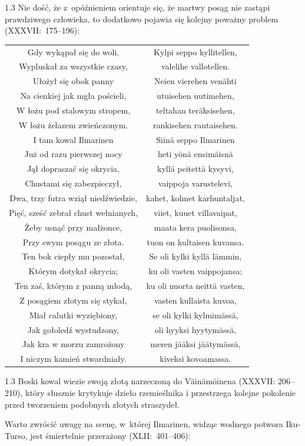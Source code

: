 \documentclass[11pt,a4paper,twoside]{report}
\begin{document}
\begin{spacing}{1.3}
Nie dość, że z~opóźnieniem orientuje się, że martwy posąg nie zastąpi prawdziwego człowieka, to dodatkowo pojawia się kolejny poważny problem (XXXVII:~175--196):
\end{spacing}
{\centering
\small
\begin{longtable}{c c}
Gdy wykąpał się do woli, & Kylpi seppo kyllitellen, \\
Wypluskał za wszystkie czasy, & valelihe vallotellen. \\
Ułożył się obok panny & Neien vierehen venähti \\
Na cienkiej jak mgła pościeli, & utuisehen uutimehen, \\
W łożu pod stalowym stropem, & teltahan teräksisehen, \\
W łożu żelazem zwieńczonym. & rankisehen rautaisehen. \\
I tam kowal Ilmarinen & Siinä seppo Ilmarinen \\
Już od razu pierwszej nocy & heti yönä ensimäisnä \\
Jął dopraszać się okrycia, & kyllä peitettä kysyvi, \\
Chustami się zabezpieczył, & vaippoja varustelevi, \\
Dwa, trzy futra wziął niedźwiedzie, & kahet, kolmet karhuntaljat, \\
Pięć, sześć zebrał chust wełnianych, & viiet, kuuet villavaipat, \\
Żeby usnąć przy małżonce, & maata kera puolisonsa, \\
Przy swym posągu ze złota. & tuon on kultaisen kuvansa. \\
Ten bok ciepły mu pozostał, & Se oli kylki kyllä lämmin, \\
Którym dotykał okrycia; & ku oli vasten vaippojansa; \\
Ten zaś, którym z panną młodą, & ku oli nuorta neittä vasten, \\
Z posągiem złotym się stykał, & vasten kullaista kuvoa, \\
Miał calutki wyziębiony, & se oli kylki kylmimässä, \\
Jak gołoledź wystudzony, & oli hyyksi hyytymässä, \\
Jak kra w morzu zamrożony & meren jääksi jäätymässä, \\
I niczym kamień stwardniały. & kiveksi kovoamassa. \\
\end{longtable}
}
\begin{spacing}{1.3}
Boski kowal wiezie swoją złotą narzeczoną do Väinämöinena (XXXVII: 206--210), który słusznie krytykuje dzieło rzemieślnika i przestrzega kolejne pokolenie przed tworzeniem podobnych złotych straszydeł.

Warto zwrócić uwagę na scenę, w~której Ilmarinen, widząc wodnego potwora Iku-Turso, jest śmiertelnie przerażony (XLII:~401--406):
\end{spacing}
\end{document}
